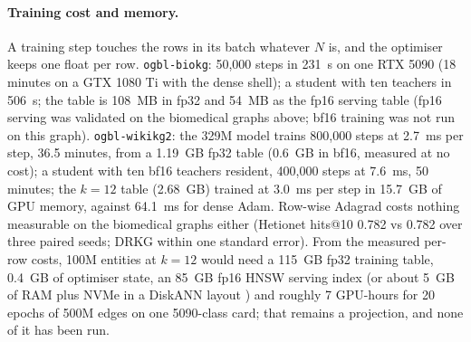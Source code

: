 \documentclass[11pt,a4paper]{article}
\begin{document}
\paragraph{Training cost and memory.} A training step touches the rows in
its batch whatever $N$ is, and the optimiser keeps one float per row.
\texttt{ogbl-biokg}: 50{,}000 steps in 231~s on one RTX 5090 (18 minutes
on a GTX 1080 Ti with the dense shell); a student with ten teachers in
506~s; the table is 108~MB in fp32 and 54~MB as the fp16 serving table
(fp16 serving was validated on the biomedical graphs above; bf16
training was not run on this graph). \texttt{ogbl-wikikg2}: the 329M model trains 800{,}000 steps at
2.7~ms per step, 36.5 minutes, from a 1.19~GB fp32 table (0.6~GB in
bf16, measured at no cost); a student with ten bf16 teachers resident, 400{,}000 steps at
7.6~ms, 50 minutes; the $k=12$ table (2.68~GB) trained at 3.0~ms per step
in 15.7~GB of GPU memory, against 64.1~ms for dense Adam. Row-wise Adagrad
costs nothing measurable on the biomedical graphs either (Hetionet
hits@10 0.782 vs 0.782 over three paired seeds; DRKG within one standard
error). From the measured per-row costs, 100M entities at $k=12$ would
need a 115~GB fp32 training table, 0.4~GB of optimiser state, an 85~GB
fp16 HNSW serving index (or about 5~GB of RAM plus NVMe in a DiskANN
layout \citep{subramanya2019diskann}) and roughly 7 GPU-hours for 20
epochs of 500M edges on one 5090-class card; that remains a projection,
and none of it has been run.
\end{document}
